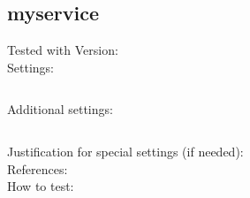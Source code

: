 \subsection{myservice}


\begin{description}
\item[Tested with Version:]

\item[Settings:] \mbox{}

\begin{lstlisting}[breaklines]
	%Here goes your setting string
\end{lstlisting}

\item[Additional settings:]


\begin{lstlisting}[breaklines]
	%copy \& paste additional settings
\end{lstlisting}

\item[Justification for special settings (if needed):]


\item[References:]


\item[How to test:]


\end{description}

